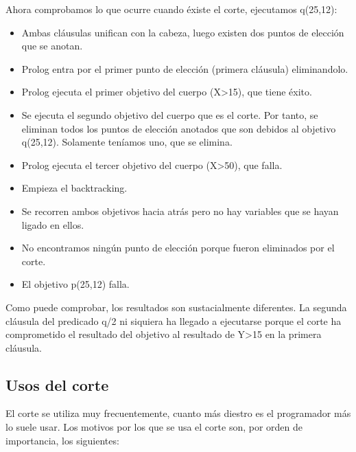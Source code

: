 \documentclass[11pt]{article}
\begin{document}
Ahora comprobamos lo que ocurre cuando éxiste el corte, ejecutamos q(25,12):

\begin{itemize}
\item Ambas cláusulas unifican con la cabeza, luego existen dos puntos de
elección que se anotan.
\item Prolog entra por el primer punto de elección (primera cláusula)
eliminandolo.
\item Prolog ejecuta el primer objetivo del cuerpo (X>15), que tiene
éxito.
\item Se ejecuta el segundo objetivo del cuerpo que es el corte. Por
tanto, se eliminan todos los puntos de elección anotados que son
debidos al objetivo q(25,12). Solamente teníamos uno, que se
elimina.
\item Prolog ejecuta el tercer objetivo del cuerpo (X>50), que falla.
\item Empieza el backtracking.
\item Se recorren ambos objetivos hacia atrás pero no hay variables que se
hayan ligado en ellos.
\item No encontramos ningún punto de elección porque fueron eliminados por
el corte.
\item El objetivo p(25,12) falla.
\end{itemize}

Como puede comprobar, los resultados son sustacialmente diferentes. La
segunda cláusula del predicado q/2 ni siquiera ha llegado a ejecutarse
porque el corte ha comprometido el resultado del objetivo al resultado
de Y>15 en la primera cláusula.


\subsection*{Usos del corte}
\label{sec:org4ed8b78}

El corte se utiliza muy frecuentemente, cuanto más diestro es el
programador más lo suele usar. Los motivos por los que se usa el corte
son, por orden de importancia, los siguientes:
\end{document}
